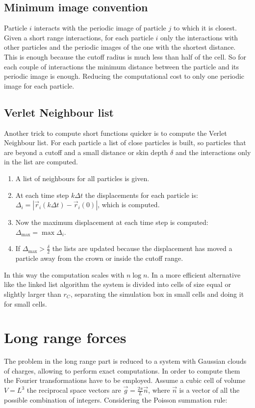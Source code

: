 	\subsection{Minimum image convention}
	Particle $i$ interacts with the periodic image of particle $j$ to which it is closest.
	Given a short range interactions, for each particle $i$ only the interactions with other particles and the periodic images of the one with the shortest distance.
	This is enough because the cutoff radius is much less than half of the cell.
	So for each couple of interactions the minimum distance between the particle and its periodic image is enough.
	Reducing the computational cost to only one periodic image for each particle.

	\subsection{Verlet Neighbour list}
	Another trick to compute short functions quicker is to compute the Verlet Neighbour list.
	For each particle a list of close particles is built, so particles that are beyond a cutoff and a small distance or skin depth $\delta$ and the interactions only in the list are computed.

	\begin{multicols}{2}
		\begin{enumerate}
			\item A list of neighbours for all particles is given.
			\item At each time step $k\Delta t$ the displacements for each particle is: $\Delta_i = |\vec{r}_i(k\Delta t) - \vec{r}_i(0)|$, which is computed.
			\item Now the maximum displacement at each time step is computed: $\Delta_{\max} = \max\Delta_i$.
			\item If $\Delta_{\max} > \frac{\delta}{2}$ the lists are updated because the displacement has moved a particle away from the crown or inside the cutoff range.
		\end{enumerate}
	\end{multicols}

	In this way the computation scales with $n\log n$.
	In a more efficient alternative like the linked list algorithm the system is divided into cells of size equal or slightly larger than $r_C$, separating the simulation box in small cells and doing it for small cells.

\section{Long range forces}
The problem in the long range part is reduced to a system with Gaussian clouds of charges, allowing to perform exact computations.
In order to compute them the Fourier transformations have to be employed.
Assume a cubic cell of volume $V = L^3$ the reciprocal space vectors are $\vec{g} = \frac{2\pi}{L}\vec{n}$, where $\vec{n}$ is a vector of all the possible combination of integers.
Considering the Poisson summation rule:

